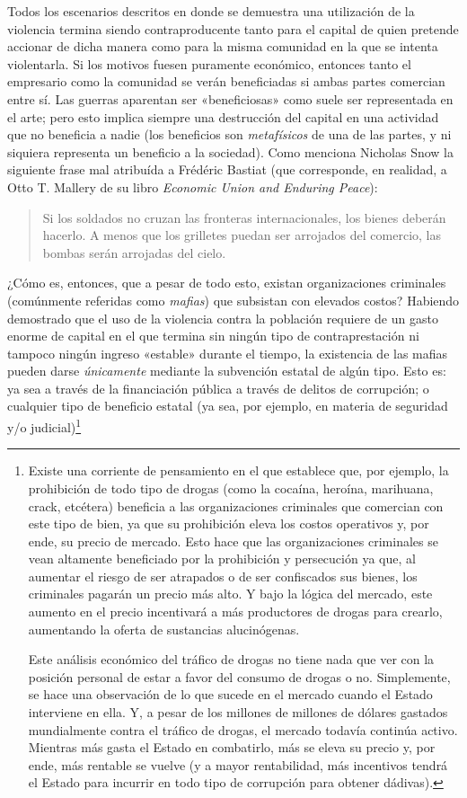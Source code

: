 \documentclass[12pt,a4paper,twoside]{book}
\begin{document}
Todos los escenarios descritos en donde se demuestra una utilización de la violencia termina siendo contraproducente tanto para el capital de quien pretende accionar de dicha manera como para la misma comunidad en la que se intenta violentarla. Si los motivos fuesen puramente económico, entonces tanto el empresario como la comunidad se verán beneficiadas si ambas partes comercian entre sí. Las guerras aparentan ser «beneficiosas» como suele ser representada en el arte; pero esto implica siempre una destrucción del capital en una actividad que no beneficia a nadie (los beneficios son \textit{metafísicos} de una de las partes, y ni siquiera representa un beneficio a la sociedad). Como menciona Nicholas Snow la siguiente frase mal atribuída a Frédéric Bastiat (que corresponde, en realidad, a Otto T. Mallery de su libro \textit{Economic Union and Enduring Peace}):

\begin{quote}
Si los soldados no cruzan las fronteras internacionales, los bienes deberán hacerlo. A menos que los grilletes puedan ser arrojados del comercio, las bombas serán arrojadas del cielo. \cite{frase:mallery}
\end{quote}

¿Cómo es, entonces, que a pesar de todo esto, existan organizaciones criminales (comúnmente referidas como \textit{mafias}) que subsistan con elevados costos? Habiendo demostrado que el uso de la violencia contra la población requiere de un gasto enorme de capital en el que termina sin ningún tipo de contraprestación ni tampoco ningún ingreso «estable» durante el tiempo, la existencia de las mafias pueden darse \textit{únicamente} mediante la subvención estatal de algún tipo. Esto es: ya sea a través de la financiación pública a través de delitos de corrupción; o cualquier tipo de beneficio estatal (ya sea, por ejemplo, en materia de seguridad y/o judicial)\footnote{Existe una corriente de pensamiento en el que establece que, por ejemplo, la prohibición de todo tipo de drogas (como la cocaína, heroína, marihuana, crack, etcétera) beneficia a las organizaciones criminales que comercian con este tipo de bien, ya que su prohibición eleva los costos operativos y, por ende, su precio de mercado. Esto hace que las organizaciones criminales se vean altamente beneficiado por la prohibición y persecución ya que, al aumentar el riesgo de ser atrapados o de ser confiscados sus bienes, los criminales pagarán un precio más alto. Y bajo la lógica del mercado, este aumento en el precio incentivará a más productores de drogas para crearlo, aumentando la oferta de sustancias alucinógenas.

Este análisis económico del tráfico de drogas no tiene nada que ver con la posición personal de estar a favor del consumo de drogas o no. Simplemente, se hace una observación de lo que sucede en el mercado cuando el Estado interviene en ella. Y, a pesar de los millones de millones de dólares gastados mundialmente contra el tráfico de drogas, el mercado todavía continúa activo. Mientras más gasta el Estado en combatirlo, más se eleva su precio y, por ende, más rentable se vuelve (y a mayor rentabilidad, más incentivos tendrá el Estado para incurrir en todo tipo de corrupción para obtener dádivas).}
\end{document}
